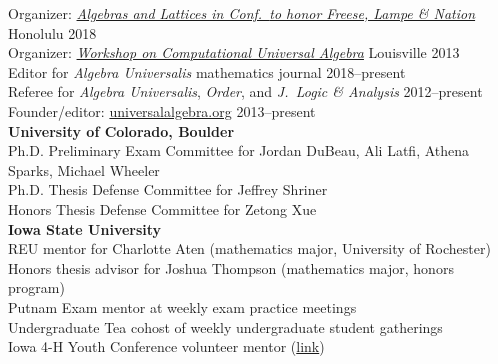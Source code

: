     \newcommand{\mytab}{\phantom{\textsl{Activities: }}}
    \renewcommand{\mytab}{\phantom{XX}}
    Organizer: \href{https://universalalgebra.github.io/ALH-2018/}
    {\emph{Algebras and Lattices in \Hawaii Conf.~{\small to honor Freese, Lampe \& Nation}}} \hfill  Honolulu 2018
    \\
    Organizer: \href{http://universalalgebra.wordpress.com/meetings/2013-workshop-on-computational-universal-algebra/}
    {\emph{Workshop on Computational Universal Algebra}} \hfill  Louisville 2013
    \\
    Editor for {\it Algebra Universalis} mathematics journal \hfill 2018--present
    \\
    Referee for {\it Algebra Universalis}, {\it Order}, and {\it J.~Logic \& Analysis} \hfill 2012--present
    \\
    Founder/editor: \href{http://universalalgebra.org}{universalalgebra.org}    \hfill 2013--present
    \\[6pt]
    \textbf{University of Colorado, Boulder} \\ %
    Ph.D. Preliminary Exam Committee for Jordan DuBeau, Ali Latfi, Athena Sparks, Michael Wheeler\\
    Ph.D. Thesis Defense Committee for Jeffrey Shriner\\
    Honors Thesis Defense Committee for Zetong Xue
    \\[6pt]
    \textbf{Iowa State University} \\ %
       REU mentor for Charlotte Aten (mathematics major, University of Rochester)\\
       Honors thesis advisor for Joshua Thompson (mathematics major, honors program)\\
       Putnam Exam mentor at weekly exam practice meetings\\
       Undergraduate Tea cohost of weekly undergraduate student gatherings\\
       Iowa 4-H Youth Conference volunteer mentor
    (\href{https://math.iastate.edu/2015/10/28/4-h-dared-to-discover-the-math-of-juggling/}{link})\\[6pt]
